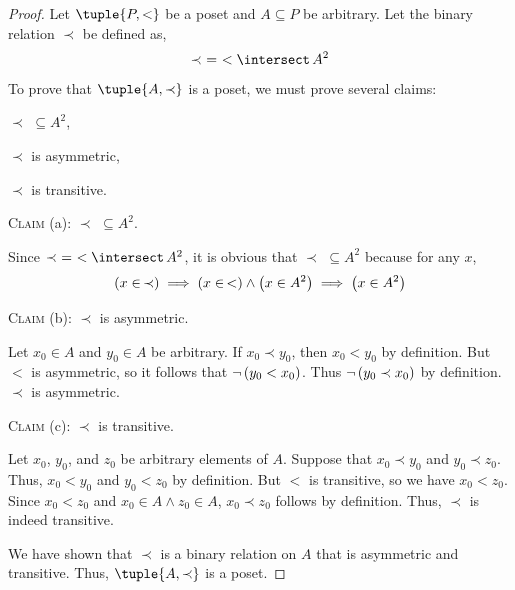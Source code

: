 \begin{proof}
    Let \( \tuple{P, <} \) be a poset and \( A \subseteq P \) be arbitrary. Let the binary relation \( \prec \) be defined
    as,
    \begin{equation*}
        \prec \,\,=\,\, < \intersect \, A^{2}
    \end{equation*}
    To prove that \( \tuple{A, \prec} \) is a poset, we must prove several claims:
    \begin{enumerate*}[label=(\alph*)]
        \item \( \prec \,\, \subseteq A^{2} \),
        \item \( \prec \) is asymmetric,
        \item \( \prec \) is transitive.
    \end{enumerate*}

    \vspace{0.5cm}
    \noindent
    {\scshape Claim} (a): \( \prec \,\, \subseteq A^{2} \).

    \vspace{0.2cm}
    \noindent
    Since \( \prec \,\, = \,\, < \intersect \, A^{2} \), it is obvious that \( \prec \,\, \subseteq A^{2} \) because
    for any \( x \),
    \begin{equation*}
        \mleft( x \in \, \prec \mright) \implies \mleft( x \in \, < \mright) \land \mleft( x \in A^{2} \mright)
        \implies \mleft( x \in A^{2} \mright)
    \end{equation*}

    \noindent
    {\scshape Claim} (b): \( \prec \) is asymmetric.

    \vspace{0.2cm}
    \noindent
    Let \( x_{0} \in A \) and \( y_{0} \in A \) be arbitrary. If \( x_{0} \prec y_{0} \), then \( x_{0} < y_{0} \) by definition.
    But \( < \) is asymmetric, so it follows that \( \lnot \, \mleft( y_{0} < x_{0} \mright) \). Thus \( \lnot \, \mleft( y_{0} \prec x_{0} \mright) \)
    by definition. \( \prec \) is asymmetric.

    \vspace{0.5cm}
    \noindent
    {\scshape Claim} (c): \( \prec \) is transitive.

    \vspace{0.2cm}
    \noindent
    Let \( x_{0} \), \( y_{0} \), and \( z_{0} \) be arbitrary elements of \( A \). Suppose that \( x_{0} \prec y_{0} \) and \( y_{0} \prec z_{0} \).
    Thus, \( x_{0} < y_{0} \) and \( y_{0} < z_{0} \) by definition. But \( < \) is transitive, so we have \( x_{0} < z_{0} \). Since \( x_{0} < z_{0} \)
    and \( x_{0} \in A \land z_{0} \in A \), \( x_{0} \prec z_{0} \) follows by definition. Thus, \( \prec \) is indeed transitive.

    \vspace{0.3cm}
    \noindent
    We have shown that \( \prec \) is a binary relation on \( A \) that is asymmetric and transitive. Thus, \( \tuple{A, \prec} \) is a poset.
\end{proof}

